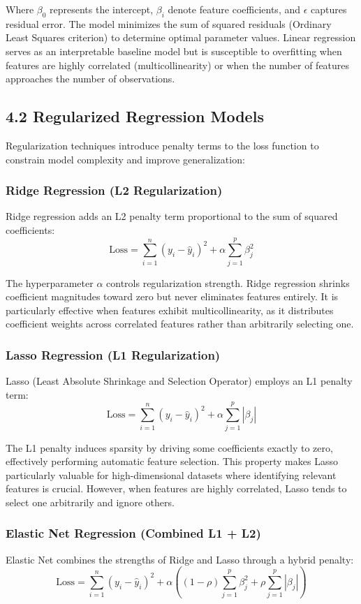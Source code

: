 \documentclass[11pt]{article}
\begin{document}
Where $\beta_0$ represents the intercept, $\beta_i$ denote feature coefficients, and $\epsilon$ captures residual error. The model minimizes the sum of squared residuals (Ordinary Least Squares criterion) to determine optimal parameter values. Linear regression serves as an interpretable baseline model but is susceptible to overfitting when features are highly correlated (multicollinearity) or when the number of features approaches the number of observations.

\subsection*{4.2 Regularized Regression Models}
Regularization techniques introduce penalty terms to the loss function to constrain model complexity and improve generalization:

\subsubsection*{Ridge Regression (L2 Regularization)}
Ridge regression adds an L2 penalty term proportional to the sum of squared coefficients:
\[
\text{Loss} = \sum_{i=1}^{n} (y_i - \hat{y}_i)^2 + \alpha \sum_{j=1}^{p} \beta_j^2
\]

The hyperparameter $\alpha$ controls regularization strength. Ridge regression shrinks coefficient magnitudes toward zero but never eliminates features entirely. It is particularly effective when features exhibit multicollinearity, as it distributes coefficient weights across correlated features rather than arbitrarily selecting one.

\subsubsection*{Lasso Regression (L1 Regularization)}
Lasso (Least Absolute Shrinkage and Selection Operator) employs an L1 penalty term:
\[
\text{Loss} = \sum_{i=1}^{n} (y_i - \hat{y}_i)^2 + \alpha \sum_{j=1}^{p} |\beta_j|
\]

The L1 penalty induces sparsity by driving some coefficients exactly to zero, effectively performing automatic feature selection. This property makes Lasso particularly valuable for high-dimensional datasets where identifying relevant features is crucial. However, when features are highly correlated, Lasso tends to select one arbitrarily and ignore others.

\subsubsection*{Elastic Net Regression (Combined L1 + L2)}
Elastic Net combines the strengths of Ridge and Lasso through a hybrid penalty:
\[
\text{Loss} = \sum_{i=1}^{n} (y_i - \hat{y}_i)^2 + \alpha \left( (1-\rho) \sum_{j=1}^{p} \beta_j^2 + \rho \sum_{j=1}^{p} |\beta_j| \right)
\]
\end{document}
